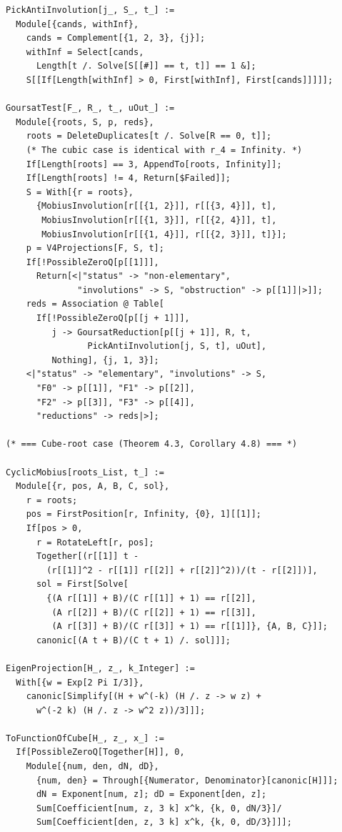 \documentclass[11pt,a4paper]{article}
\theoremstyle{plain}
\theoremstyle{definition}
\theoremstyle{remark}
\begin{document}
\begin{lstlisting}
PickAntiInvolution[j_, S_, t_] :=
  Module[{cands, withInf},
    cands = Complement[{1, 2, 3}, {j}];
    withInf = Select[cands,
      Length[t /. Solve[S[[#]] == t, t]] == 1 &];
    S[[If[Length[withInf] > 0, First[withInf], First[cands]]]]];

GoursatTest[F_, R_, t_, uOut_] :=
  Module[{roots, S, p, reds},
    roots = DeleteDuplicates[t /. Solve[R == 0, t]];
    (* The cubic case is identical with r_4 = Infinity. *)
    If[Length[roots] == 3, AppendTo[roots, Infinity]];
    If[Length[roots] != 4, Return[$Failed]];
    S = With[{r = roots},
      {MobiusInvolution[r[[{1, 2}]], r[[{3, 4}]], t],
       MobiusInvolution[r[[{1, 3}]], r[[{2, 4}]], t],
       MobiusInvolution[r[[{1, 4}]], r[[{2, 3}]], t]}];
    p = V4Projections[F, S, t];
    If[!PossibleZeroQ[p[[1]]],
      Return[<|"status" -> "non-elementary",
              "involutions" -> S, "obstruction" -> p[[1]]|>]];
    reds = Association @ Table[
      If[!PossibleZeroQ[p[[j + 1]]],
         j -> GoursatReduction[p[[j + 1]], R, t,
                PickAntiInvolution[j, S, t], uOut],
         Nothing], {j, 1, 3}];
    <|"status" -> "elementary", "involutions" -> S,
      "F0" -> p[[1]], "F1" -> p[[2]],
      "F2" -> p[[3]], "F3" -> p[[4]],
      "reductions" -> reds|>];

(* === Cube-root case (Theorem 4.3, Corollary 4.8) === *)

CyclicMobius[roots_List, t_] :=
  Module[{r, pos, A, B, C, sol},
    r = roots;
    pos = FirstPosition[r, Infinity, {0}, 1][[1]];
    If[pos > 0,
      r = RotateLeft[r, pos];
      Together[(r[[1]] t -
        (r[[1]]^2 - r[[1]] r[[2]] + r[[2]]^2))/(t - r[[2]])],
      sol = First[Solve[
        {(A r[[1]] + B)/(C r[[1]] + 1) == r[[2]],
         (A r[[2]] + B)/(C r[[2]] + 1) == r[[3]],
         (A r[[3]] + B)/(C r[[3]] + 1) == r[[1]]}, {A, B, C}]];
      canonic[(A t + B)/(C t + 1) /. sol]]];

EigenProjection[H_, z_, k_Integer] :=
  With[{w = Exp[2 Pi I/3]},
    canonic[Simplify[(H + w^(-k) (H /. z -> w z) +
      w^(-2 k) (H /. z -> w^2 z))/3]]];

ToFunctionOfCube[H_, z_, x_] :=
  If[PossibleZeroQ[Together[H]], 0,
    Module[{num, den, dN, dD},
      {num, den} = Through[{Numerator, Denominator}[canonic[H]]];
      dN = Exponent[num, z]; dD = Exponent[den, z];
      Sum[Coefficient[num, z, 3 k] x^k, {k, 0, dN/3}]/
      Sum[Coefficient[den, z, 3 k] x^k, {k, 0, dD/3}]]];


\end{lstlisting}
\end{document}
